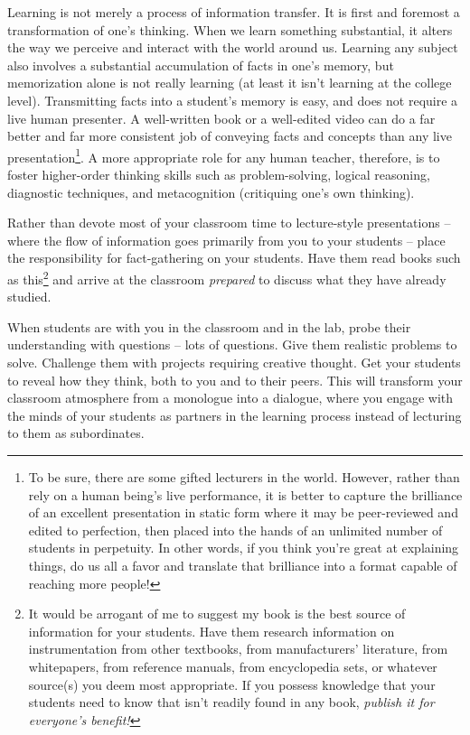 Learning is not merely a process of information transfer.  It is first and foremost a transformation of one's thinking.  When we learn something substantial, it alters the way we perceive and interact with the world around us.  Learning any subject also involves a substantial accumulation of facts in one's memory, but memorization alone is not really learning (at least it isn't learning at the college level).  Transmitting facts into a student's memory is easy, and does not require a live human presenter.  A well-written book or a well-edited video can do a far better and far more consistent job of conveying facts and concepts than any live presentation\footnote{To be sure, there are some gifted lecturers in the world.  However, rather than rely on a human being's live performance, it is better to capture the brilliance of an excellent presentation in static form where it may be peer-reviewed and edited to perfection, then placed into the hands of an unlimited number of students in perpetuity.  In other words, if you think you're great at explaining things, do us all a favor and translate that brilliance into a format capable of reaching more people!}.  A more appropriate role for any human teacher, therefore, is to foster higher-order thinking skills such as problem-solving, logical reasoning, diagnostic techniques, and metacognition (critiquing one's own thinking).

Rather than devote most of your classroom time to lecture-style presentations -- where the flow of information goes primarily from you to your students -- place the responsibility for fact-gathering on your students.  Have them read books such as this\footnote{It would be arrogant of me to suggest my book is the best source of information for your students.  Have them research information on instrumentation from other textbooks, from manufacturers' literature, from whitepapers, from reference manuals, from encyclopedia sets, or whatever source(s) you deem most appropriate.  If you possess knowledge that your students need to know that isn't readily found in any book, \textit{publish it for everyone's benefit!}} and arrive at the classroom \textit{prepared} to discuss what they have already studied.  

When students are with you in the classroom and in the lab, probe their understanding with questions -- lots of questions.  Give them realistic problems to solve.  Challenge them with projects requiring creative thought.  Get your students to reveal how they think, both to you and to their peers.  This will transform your classroom atmosphere from a monologue into a dialogue, where you engage with the minds of your students as partners in the learning process instead of lecturing to them as subordinates.

